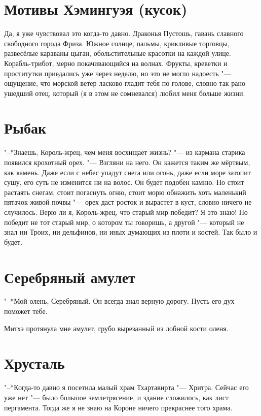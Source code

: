 \documentclass[a4paper,10pt]{book}
\newcommand{\ldotst}{\so{...}\xspace}
\begin{document}
\section{Мотивы Хэмингуэя (кусок)}

Да, я уже чувствовал это когда-то давно. Драконья Пустошь, гавань славного 
свободного города Фриза. Южное солнце, пальмы, крикливые торговцы, развесёлые 
караваны цыган, обольстительные красотки на каждой улице. Корабль-трибот, мерно 
покачивающийся на волнах. Фрукты, креветки и проститутки приедались уже через 
неделю, но это не могло надоесть "--- ощущение, что морской ветер ласково 
гладит 
тебя по голове, словно так рано ушедший отец, который (я в этом не сомневался) 
любил меня больше жизни.

\section{Рыбак}

"--*Знаешь, Король-жрец, чем меня восхищает жизнь? "--- из кармана старика 
появился крохотный орех. "--- Взгляни на него. Он кажется таким же мёртвым, как 
камень. Даже если с небес упадут снега или огонь, даже если море затопит сушу, 
его суть не изменится ни на волос. Он будет подобен камню. Но стоит растаять 
снегам, стоит погаснуть огню, стоит морю обнажить хоть маленький пятачок живой 
почвы "--- орех даст росток и вырастет в куст, словно ничего не случилось. Верю 
ли я, Король-жрец, что старый мир победит? Я это знаю! Но победит не тот старый 
мир, о котором ты говоришь, а другой "--- который не знал ни Троих, ни 
дельфинов, ни иных думающих из плоти и костей. Так было и будет.

\section{Серебряный амулет}

"--*Мой олень, Серебряный. Он всегда знал верную дорогу. Пусть его дух поможет 
тебе.

Митхэ протянула мне амулет, грубо вырезанный из лобной кости оленя.

\section{Хрусталь}

"--*Когда-то давно я посетила малый храм Тхартавирта "--- Хритра. Сейчас его 
уже 
нет "--- было большое землетрясение, и здание сложилось, как лист пергамента. 
Тогда же\ldotst я не знаю на Короне ничего прекраснее того храма.
\end{document}
